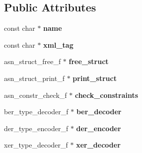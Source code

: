 \subsection*{Public Attributes}
\begin{DoxyCompactItemize}
\item 
const char $\ast$ {\bfseries name}\hypertarget{structasn__TYPE__descriptor__s_a8a8966744e76300bbcf4b18acfba6583}{}\label{structasn__TYPE__descriptor__s_a8a8966744e76300bbcf4b18acfba6583}

\item 
const char $\ast$ {\bfseries xml\+\_\+tag}\hypertarget{structasn__TYPE__descriptor__s_a5a54d0f35790598d15c38e20e26d0c62}{}\label{structasn__TYPE__descriptor__s_a5a54d0f35790598d15c38e20e26d0c62}

\item 
asn\+\_\+struct\+\_\+free\+\_\+f $\ast$ {\bfseries free\+\_\+struct}\hypertarget{structasn__TYPE__descriptor__s_a9582a3b6bf69f704147a84293996bc87}{}\label{structasn__TYPE__descriptor__s_a9582a3b6bf69f704147a84293996bc87}

\item 
asn\+\_\+struct\+\_\+print\+\_\+f $\ast$ {\bfseries print\+\_\+struct}\hypertarget{structasn__TYPE__descriptor__s_ae95ed405f6b0d12dd83a2f7415b23563}{}\label{structasn__TYPE__descriptor__s_ae95ed405f6b0d12dd83a2f7415b23563}

\item 
asn\+\_\+constr\+\_\+check\+\_\+f $\ast$ {\bfseries check\+\_\+constraints}\hypertarget{structasn__TYPE__descriptor__s_aa0cc7d278b7ecef7f83c25da3c73c0d9}{}\label{structasn__TYPE__descriptor__s_aa0cc7d278b7ecef7f83c25da3c73c0d9}

\item 
ber\+\_\+type\+\_\+decoder\+\_\+f $\ast$ {\bfseries ber\+\_\+decoder}\hypertarget{structasn__TYPE__descriptor__s_ab4d569207532fe71a3f2cb0f25d0a25f}{}\label{structasn__TYPE__descriptor__s_ab4d569207532fe71a3f2cb0f25d0a25f}

\item 
der\+\_\+type\+\_\+encoder\+\_\+f $\ast$ {\bfseries der\+\_\+encoder}\hypertarget{structasn__TYPE__descriptor__s_a8babc45f0567d8de5f2e403acdb9d9ad}{}\label{structasn__TYPE__descriptor__s_a8babc45f0567d8de5f2e403acdb9d9ad}

\item 
xer\+\_\+type\+\_\+decoder\+\_\+f $\ast$ {\bfseries xer\+\_\+decoder}\hypertarget{structasn__TYPE__descriptor__s_a1234d8ff33b0b6b3a47439546bf3db78}{}\label{structasn__TYPE__descriptor__s_a1234d8ff33b0b6b3a47439546bf3db78}


\end{DoxyCompactItemize}

